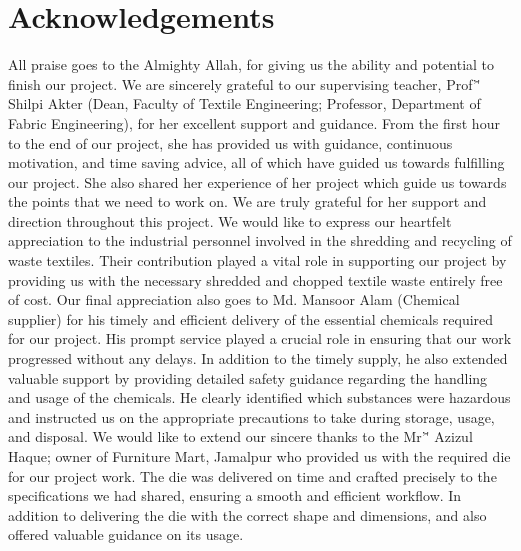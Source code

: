 \section*{Acknowledgements}
All praise goes to the Almighty Allah, for giving us the ability and potential to finish 
our project. We are sincerely grateful to our supervising teacher, Prof'\.' Shilpi Akter (Dean, Faculty of Textile Engineering; Professor, Department of Fabric Engineering), for her excellent support and guidance. From the first hour to the end of our project, she has provided us with guidance, continuous motivation, and time saving advice, all of which have guided us towards fulfilling our project. She also shared her experience of her project which guide us towards the points that we need to work on. We are truly grateful for her support and direction throughout this project. We would like to express our heartfelt appreciation to the industrial personnel involved in the shredding and recycling of waste textiles. Their contribution played a vital role in supporting our project by providing us with the necessary shredded and chopped textile waste entirely free of cost. Our final appreciation also goes to Md. Mansoor Alam (Chemical supplier) for his timely and efficient delivery of the essential chemicals required for our project. His prompt service played a crucial role in ensuring that our work progressed without any delays. In addition to the timely supply, he also extended valuable support by providing detailed safety guidance regarding the handling and usage of the chemicals. He clearly identified which substances were hazardous and instructed us on the appropriate precautions to take during storage, usage, and disposal. We would like to extend our sincere thanks to the Mr'\.' Azizul Haque; owner of Furniture Mart, Jamalpur who provided us with the required die for our project work. The die was delivered on time and crafted precisely to the specifications we had shared, ensuring a smooth and efficient workflow. In addition to delivering the die with the correct shape and dimensions, and also offered valuable guidance on its usage.  